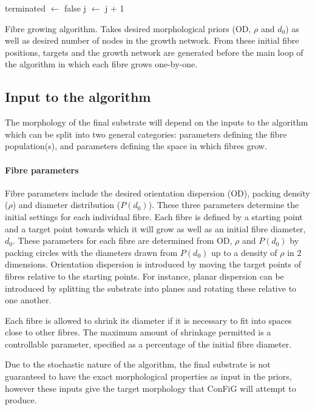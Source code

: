 \begin{algorithm}
\begin{algorithmic}
    \State \hspace{3em} terminated $\leftarrow$ false
    \State \hspace{3em} j $\leftarrow$ j + 1
    \EndWhile
    \EndFor
    \EndProcedure
  \end{algorithmic}
  \caption[Fibre growth algorithm.]{Fibre growing algorithm. Takes desired morphological priors (OD, $\rho$ and $d_0$) as well as desired number of nodes in the growth network. From these initial fibre positions, targets and the growth network are generated before the main loop of the algorithm in which each fibre grows one-by-one.}
  \label{alg:main_algorithm}
\end{algorithm}

\subsection{Input to the algorithm}
\label{sec:config_input}
The morphology of the final substrate will depend on the inputs to the algorithm which can be split into two general categories: parameters defining the fibre population(s), and parameters defining the space in which fibres grow.

\paragraph*{Fibre parameters}
Fibre parameters include the desired orientation dispersion (OD), packing density ($\rho$) and diameter distribution ($P(d_0)$).
These three parameters determine the initial settings for each individual fibre. 
Each fibre is defined by a starting point and a target point towards which it will grow as well as an initial fibre diameter, $d_0$.
These parameters for each fibre are determined from OD, $\rho$ and $P(d_0)$ by packing circles with the diameters drawn from $P(d_0)$ up to a density of $\rho$ in 2 dimensions. Orientation dispersion is introduced by moving the target points of fibres relative to the starting points. For instance, planar dispersion can be introduced by splitting the substrate into planes and rotating these relative to one another.

Each fibre is allowed to shrink its diameter if it is necessary to fit into spaces close to other fibres.
The maximum amount of shrinkage permitted is a controllable parameter, specified as a percentage of the initial fibre diameter.

Due to the stochastic nature of the algorithm, the final substrate is not guaranteed to have the exact morphological properties as input in the priors, however these inputs give the target morphology that ConFiG will attempt to produce.

